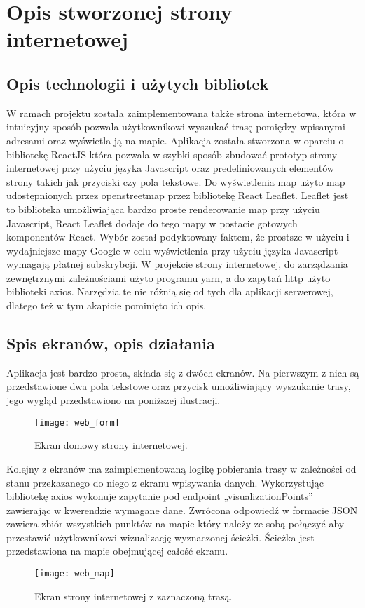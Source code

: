 \section{Opis stworzonej strony internetowej}

\subsection{Opis technologii i użytych bibliotek}

W ramach projektu została zaimplementowana także strona internetowa, która w intuicyjny sposób pozwala użytkownikowi wyszukać trasę pomiędzy wpisanymi adresami oraz wyświetla ją na mapie. 
Aplikacja została stworzona w oparciu o bibliotekę ReactJS która pozwala w szybki sposób zbudować prototyp strony internetowej przy użyciu języka Javascript oraz predefiniowanych elementów strony takich jak przyciski czy pola tekstowe. Do wyświetlenia map użyto map udostępnionych przez openstreetmap przez bibliotekę React Leaflet. Leaflet jest to biblioteka umożliwiająca bardzo proste renderowanie map przy użyciu Javascript, React Leaflet dodaje do tego mapy w postacie gotowych komponentów React. Wybór został podyktowany faktem, że prostsze w użyciu i wydajniejsze mapy Google w celu wyświetlenia przy użyciu języka Javascript wymagają płatnej subskrybcji.
W projekcie strony internetowej, do zarządzania zewnętrznymi zależnościami użyto programu yarn, a do zapytań http użyto biblioteki axios. Narzędzia te nie różnią się od tych dla aplikacji serwerowej, dlatego też w tym akapicie pominięto ich opis.

\subsection{Spis ekranów, opis działania}

Aplikacja jest bardzo prosta, składa się z dwóch ekranów. Na pierwszym z nich są przedstawione dwa pola tekstowe oraz przycisk umożliwiający wyszukanie trasy, jego wygląd przedstawiono na poniższej ilustracji.

\begin{figure}[H]
\centering
\texttt{[image: web\_form]}
\caption{Ekran domowy strony internetowej.}
\end{figure}

Kolejny z ekranów ma zaimplementowaną logikę pobierania trasy w zależności od stanu przekazanego do niego z ekranu wpisywania danych. Wykorzystując bibliotekę axios wykonuje zapytanie pod endpoint „visualizationPoints” zawierając w kwerendzie wymagane dane. Zwrócona odpowiedź w formacie JSON zawiera zbiór wszystkich punktów na mapie który należy ze sobą połączyć aby przestawić użytkownikowi wizualizację wyznaczonej ścieżki. Ścieżka jest przedstawiona na mapie obejmującej całość ekranu.

\begin{figure}[H]
\centering
\texttt{[image: web\_map]}
\caption{Ekran strony internetowej z zaznaczoną trasą.}
\end{figure}

